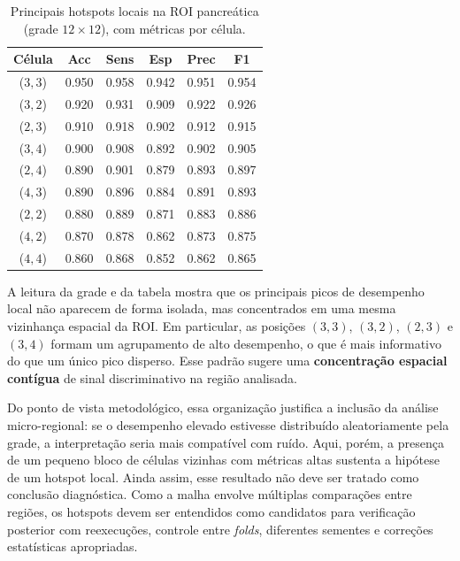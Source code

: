 \documentclass[12pt,a4paper]{article}
\begin{document}
\begin{table}[htbp]
\centering
\caption{Principais hotspots locais na ROI pancreática (grade \(12\times 12\)), com métricas por célula.}
\label{tab:roi-pancreas-metricas-locais}
\small
\setlength{\tabcolsep}{4pt}
\renewcommand{\arraystretch}{1.12}
\begin{tabular}{cccccc}
\toprule
\textbf{Célula} & \textbf{Acc} & \textbf{Sens} & \textbf{Esp} & \textbf{Prec} & \textbf{F1} \\
\midrule
(\(3,3\)) & 0.950 & 0.958 & 0.942 & 0.951 & 0.954 \\
(\(3,2\)) & 0.920 & 0.931 & 0.909 & 0.922 & 0.926 \\
(\(2,3\)) & 0.910 & 0.918 & 0.902 & 0.912 & 0.915 \\
(\(3,4\)) & 0.900 & 0.908 & 0.892 & 0.902 & 0.905 \\
(\(2,4\)) & 0.890 & 0.901 & 0.879 & 0.893 & 0.897 \\
(\(4,3\)) & 0.890 & 0.896 & 0.884 & 0.891 & 0.893 \\
(\(2,2\)) & 0.880 & 0.889 & 0.871 & 0.883 & 0.886 \\
(\(4,2\)) & 0.870 & 0.878 & 0.862 & 0.873 & 0.875 \\
(\(4,4\)) & 0.860 & 0.868 & 0.852 & 0.862 & 0.865 \\
\bottomrule
\end{tabular}
\end{table}

A leitura da grade e da tabela mostra que os principais picos de desempenho local não aparecem de forma isolada, mas concentrados em uma mesma vizinhança espacial da ROI. Em particular, as posições \((3,3)\), \((3,2)\), \((2,3)\) e \((3,4)\) formam um agrupamento de alto desempenho, o que é mais informativo do que um único pico disperso. Esse padrão sugere uma \textbf{concentração espacial contígua} de sinal discriminativo na região analisada.

Do ponto de vista metodológico, essa organização justifica a inclusão da análise micro-regional: se o desempenho elevado estivesse distribuído aleatoriamente pela grade, a interpretação seria mais compatível com ruído. Aqui, porém, a presença de um pequeno bloco de células vizinhas com métricas altas sustenta a hipótese de um hotspot local. Ainda assim, esse resultado não deve ser tratado como conclusão diagnóstica. Como a malha envolve múltiplas comparações entre regiões, os hotspots devem ser entendidos como candidatos para verificação posterior com reexecuções, controle entre \textit{folds}, diferentes sementes e correções estatísticas apropriadas.
\end{document}
